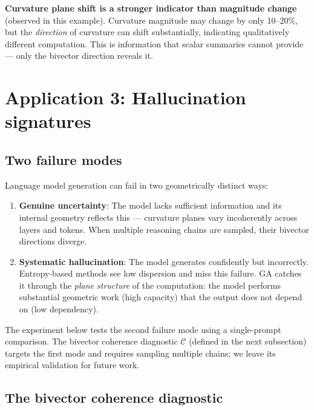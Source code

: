 \documentclass[11pt, twoside, openright]{memoir}
\numberwithin{equation}{chapter}
\begin{document}
\begin{finding}
\textbf{Curvature plane shift is a stronger indicator than magnitude
change} (observed in this example).  Curvature magnitude may
change by only 10--20\%, but the \emph{direction} of curvature can
shift substantially, indicating
qualitatively different computation.  This is information that scalar
summaries cannot provide --- only the bivector direction reveals it.
\end{finding}

\section{Application 3: Hallucination signatures}
\label{sec:hallucination}

\subsection{Two failure modes}

Language model generation can fail in two geometrically distinct ways:

\begin{enumerate}[nosep]
\item \textbf{Genuine uncertainty}: The model lacks sufficient
  information and its internal geometry reflects this --- curvature
  planes vary incoherently across layers and tokens.  When multiple
  reasoning chains are sampled, their bivector directions diverge.
\item \textbf{Systematic hallucination}: The model generates
  confidently but incorrectly.  Entropy-based methods see low
  dispersion and miss this failure.  GA catches it through the
  \emph{plane structure} of the computation: the model performs
  substantial geometric work (high capacity) that the output does
  not depend on (low dependency).
\end{enumerate}

The experiment below tests the second failure mode using a
single-prompt comparison.  The bivector coherence diagnostic
$\mathcal{C}$ (defined in the next subsection) targets the first
mode and requires sampling multiple chains; we leave its empirical
validation for future work.

\subsection{The bivector coherence diagnostic}
\end{document}
